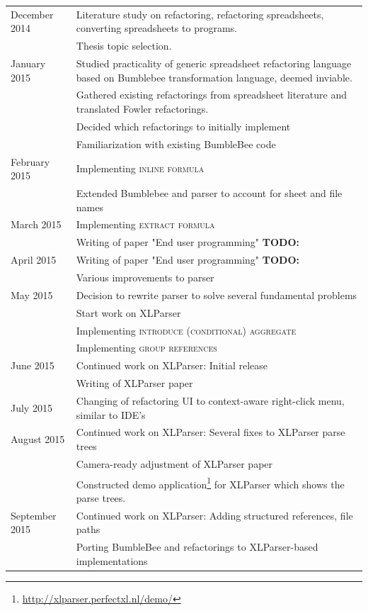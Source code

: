 \documentclass[12pt,a4paper,onecolumn,oneside,parskip]{memoir}
\newcommand{\todo}[1]{\textbf{TODO: #1}}
\newcommand{\rf}[1]{\textsc{\lowercase{#1}}}
\begin{document}
\begin{tabularx}{\textwidth}{lX}
\toprule
December 2014 & Literature study on refactoring, refactoring spreadsheets, converting spreadsheets to programs. \\
& Thesis topic selection. \\
January 2015 & Studied practicality of generic spreadsheet refactoring language based on Bumblebee transformation language, deemed inviable. \\
& Gathered existing refactorings from spreadsheet literature and translated Fowler refactorings. \\
& Decided which refactorings to initially implement \\
& Familiarization with existing BumbleBee code \\
February 2015 & Implementing \rf{Inline Formula} \\
& Extended Bumblebee and parser to account for sheet and file names \\
March 2015 & Implementing \rf{Extract formula} \\
& Writing of paper "End user programming" \todo{} \\
April 2015 & Writing of paper "End user programming" \todo{} \\
& Various improvements to parser \\
May 2015 & Decision to rewrite parser to solve several fundamental problems \\
& Start work on XLParser \\
& Implementing \rf{Introduce (Conditional) Aggregate} \\
& Implementing \rf{Group references} \\
June 2015 & Continued work on XLParser: Initial release \\
& Writing of XLParser paper \\
July 2015 & Changing of refactoring UI to context-aware right-click menu, similar to IDE's \\
August 2015 & Continued work on XLParser: Several fixes to XLParser parse trees \\
& Camera-ready adjustment of XLParser paper \\
& Constructed demo application\footnote{\url{http://xlparser.perfectxl.nl/demo/}} for XLParser which shows the parse trees. \\
September 2015 & Continued work on XLParser: Adding structured references, file paths \\
& Porting BumbleBee and refactorings to XLParser-based implementations \\
\bottomrule
\end{tabularx}
\end{document}
